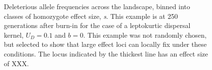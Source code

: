 \begin{figure}[h]%
\centering
{}
\caption[Deleterious allele frequencies across the landscape.]{Deleterious allele frequencies across the landscape, binned into classes of homozygote effect size, \emph{s}. This example is at 250 generations after burn-in for the case of a leptokurtic dispersal kernel, $U_D = 0.1$ and $b = 0$. This example was not randomly chosen, but selected to show that large effect loci can locally fix under these conditions. The locus indicated by the thickest line has an effect size of \color{red}XXX\color{black}.}
\label{fig:allfreqs}
\end{figure}





